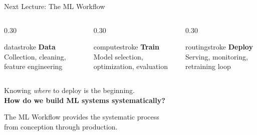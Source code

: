 \documentclass[aspectratio=169, 12pt]{beamer}
\begin{document}
\begin{frame}{Next Lecture: The ML Workflow}
\note{
%
%
}

\small
\centering
\vspace{0.5cm}

\begin{columns}[c]
  \begin{column}{0.30\textwidth}
    \centering
    \begin{mlsyscard}{datastroke}
    {\normalsize\bfseries Data}\\[0.1cm]
    {\footnotesize Collection, cleaning, feature engineering}
    \end{mlsyscard}
  \end{column}
  \begin{column}{0.30\textwidth}
    \centering
    \begin{mlsyscard}{computestroke}
    {\normalsize\bfseries Train}\\[0.1cm]
    {\footnotesize Model selection, optimization, evaluation}
    \end{mlsyscard}
  \end{column}
  \begin{column}{0.30\textwidth}
    \centering
    \begin{mlsyscard}{routingstroke}
    {\normalsize\bfseries Deploy}\\[0.1cm]
    {\footnotesize Serving, monitoring, retraining loop}
    \end{mlsyscard}
  \end{column}
\end{columns}

\vspace{0.4cm}
{\normalsize Knowing \emph{where} to deploy is the beginning.}\\[0.1cm]
{\normalsize\textbf{How do we build ML systems systematically?}}

\vspace{0.3cm}
{\small The ML Workflow provides the systematic process\\from conception through production.}

\end{frame}
\end{document}
